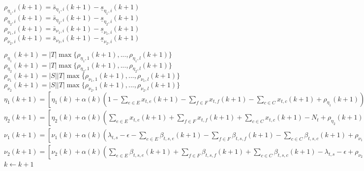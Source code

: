 \begin{latin}
\begin{algorithm}
\begin{algorithmic}[1]
					\State $\rho_{\eta_1,i}(k+1) = \bar{s}_{\eta_1,i}(k+1) - \underline{s}_{\eta_1,i}(k+1)$
					\State $\rho_{\eta_2,i}(k+1) = \bar{s}_{\eta_2,i}(k+1) - \underline{s}_{\eta_2,i}(k+1)$
					\State $\rho_{\nu_1,i}(k+1) = \bar{s}_{\nu_1,i}(k+1) - \underline{s}_{\nu_1,i}(k+1)$
					\State $\rho_{\nu_2,i}(k+1) = \bar{s}_{\nu_2,i}(k+1) - \underline{s}_{\nu_2,i}(k+1)$
				\EndFor
				
				\State $\rho_{\eta_1}(k+1) = |T| \max \{ \rho_{\eta_1,1}(k+1), ..., \rho_{\eta_1,l}(k+1)\}$
				\State $\rho_{\eta_2}(k+1) = |T| \max \{ \rho_{\eta_2,1}(k+1), ..., \rho_{\eta_2,l}(k+1)\}$
				\State $\rho_{\nu_1}(k+1) = |S||T| \max \{ \rho_{\nu_1,1}(k+1), ..., \rho_{\nu_1,l}(k+1)\}$
				\State $\rho_{\nu_2}(k+1) = |S||T| \max \{ \rho_{\nu_2,1}(k+1), ..., \rho_{\nu_2,l}(k+1)\}$
				\State $\eta_1(k+1) = [\eta_1(k) + \alpha(k)(1-\sum_{e \in E}x_{t,e}(k+1) - \sum_{f \in F}x_{t,f}(k+1) - \sum_{c \in C}x_{t,c}(k+1)+\rho_{\eta_1}(k+1))]_+$
				\State $\eta_2(k+1) = [\eta_2(k) + \alpha(k)(\sum_{e \in E}x_{t,e}(k+1) + \sum_{f \in F}x_{t,f}(k+1) + \sum_{c \in C}x_{t,c}(k+1) - N_t +\rho_{\eta_2}(k+1))]_+$
				\State $\nu_1(k+1) = [\nu_1(k) + \alpha(k)( \lambda_{t,s} - \epsilon - \sum_{e \in E}\beta_{t,s,e}(k+1) - \sum_{f \in F}\beta_{t,s,f}(k+1) - \sum_{c \in C}\beta_{t,s,c}(k+1) +\rho_{\nu_1}(k+1))]_+$
				\State $\nu_2(k+1) = [\nu_2(k) + \alpha(k)( \sum_{e \in E}\beta_{t,s,e}(k+1) + \sum_{f \in F}\beta_{t,s,f}(k+1) + \sum_{c \in C}\beta_{t,s,c}(k+1) -\lambda_{t,s} - \epsilon + \rho_{\nu_2}(k+1))]_+$
				\State $k \gets k+1$ 
			\EndProcedure
		\end{algorithmic}
	\end{algorithm}
\end{latin}

